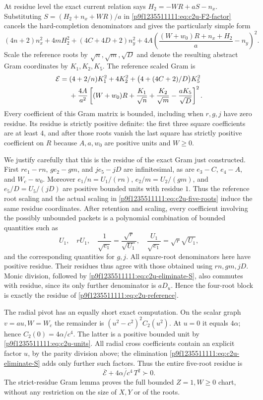 At residue level the exact current relation says
$H_2=-WR+aS-n_x$.  Substituting
$S=(H_2+n_x+WR)/a$ in \eqref{p9f1235511111:eq:c2u-F2-factor} cancels the
hard-completion denominators and gives the particularly simple form
\begin{equation}
(4n+2)n_x^2+4mH_2^2+(4C+4D+2)n_y^2
 +4A\left(\frac{(W+w_0)R+n_x+H_2}{a}-n_y\right)^2.
\label{p9f1235511111:eq:c2u-pre-scaled}
\end{equation}
Scale the reference roots by $\sqrt n,\sqrt m,\sqrt D$ and denote
the resulting abstract Gram coordinates by $K_1,K_2,K_5$.  The reference
scaled Gram is
\begin{align}
\mathcal E={}&(4+2/n)K_1^2+4K_2^2
 +\bigl(4+(4C+2)/D\bigr)K_5^2\notag\\
&+\frac{4A}{a^2}\left[
(W+w_0)R+\frac{K_1}{\sqrt n}+\frac{K_2}{\sqrt m}
-\frac{aK_5}{\sqrt D}\right]^2.
\label{p9f1235511111:eq:c2u-reference}
\end{align}
Every coefficient of this Gram matrix is bounded, including when
$r,g,j$ have zero residue.  Its residue is strictly positive definite:
the first three square coefficients are at least $4$, and after those
roots vanish the last square has strictly positive coefficient on $R$
because $A,a,w_0$ are positive units and $W\geq0$.

We justify carefully that this is the residue of the exact Gram just
constructed.  First $re_1-rn$, $ge_2-gm$, and $je_5-jD$ are
infinitesimal, as are $e_3-C$, $e_4-A$, and $W_c-w_0$.
Moreover $e_1/n=U_1/(rn)$, $e_2/m=U_2/(gm)$, and
$e_5/D=U_5/(jD)$ are positive bounded units with residue $1$.
Thus the reference root scaling and the actual scaling in
\eqref{p9f1235511111:eq:c2u-five-roots} induce the same residue coordinates.
After retention and scaling, every coefficient involving the possibly
unbounded packets is a polynomial combination of bounded quantities
such as
\[
U_1,\quad rU_1,\quad \frac1{\sqrt{e_1}}=
\frac{\sqrt r}{\sqrt{U_1}},\quad
\frac{U_1}{\sqrt{e_1}}=\sqrt r\sqrt{U_1},
\]
and the corresponding quantities for $g,j$.  All square-root
denominators here have positive residue.  Their residues thus agree
with those obtained using $rn,gm,jD$.  Monic division, followed by
\eqref{p9f1235511111:eq:c2u-eliminate-S}, also commutes with residue, since its
only further denominator is $aD_u$.  Hence the four-root block is
exactly the residue of \eqref{p9f1235511111:eq:c2u-reference}.

The radial pivot has an equally short exact computation.  On the scalar
graph $v=au,W=W_c$ the remainder is
$(u^2-c^2)^2C_2(u^2)$.  At $u=0$ it equals $4\alpha$; hence
$C_2(0)=4\alpha/c^4$.  The latter is a positive bounded unit by
\eqref{p9f1235511111:eq:c2u-units}.  All radial cross coefficients contain
an explicit factor $u$, by the parity division above; the elimination
\eqref{p9f1235511111:eq:c2u-eliminate-S} adds only further such factors.
Thus the entire five-root residue is
\begin{equation}
\overline{\mathcal E}
 +4\overline{\alpha/c^4}\,T^2\succ0.
\label{p9f1235511111:eq:c2u-strict-residue}
\end{equation}
The strict-residue Gram lemma proves the full bounded $Z=1,W\geq0$
chart, without any restriction on the size of $X,Y$ or of the roots.

